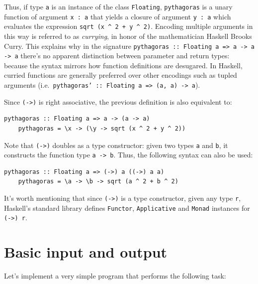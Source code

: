 \documentclass[UdineBachThesis,american,11pt]{PhdThesis}
\begin{document}
  Thus, if type \texttt{a} is an instance of the class \mbox{\texttt{Floating}},
  \mbox{\texttt{pythagoras}} is a unary function of argument
  \mbox{\texttt{x : a}} that yields a closure of argument \mbox{\texttt{y : a}}
  which evaluates the expression
  \mbox{\texttt{sqrt (x {\textasciicircum} 2 + y {\textasciicircum} 2)}}.
  Encoding multiple arguments in this way is referred to as \emph{currying}, in
  honor of the mathematician Haskell Brooks Curry. This explains why in the
  signature \mbox{\texttt{pythagoras :: Floating a => a -> a -> a}} there's no
  apparent distinction between parameter and return types: because the syntax
  mirrors how function definitions are desugared. In Haskell, curried functions
  are generally preferred over other encodings such as tupled arguments (i.e.\
  \mbox{\texttt{pythagoras' :: Floating a => (a, a) -> a}}).

  Since \mbox{\texttt{(->)}} is right associative, the previous definition is
  also equivalent to:

  \begin{Verbatim}[gobble=4,fontsize=\small]
    pythagoras :: Floating a => a -> (a -> a)
    pythagoras = \x -> (\y -> sqrt (x ^ 2 + y ^ 2))
  \end{Verbatim}

  Note that \mbox{\texttt{(->)}} doubles as a type constructor: given two types
  \texttt{a} and \texttt{b}, it constructs the function type
  \mbox{\texttt{a -> b}}. Thus, the following syntax can also be used:

  \begin{Verbatim}[gobble=4,fontsize=\small]
    pythagoras :: Floating a => (->) a ((->) a a)
    pythagoras = \a -> \b -> sqrt (a ^ 2 + b ^ 2)
  \end{Verbatim}

  It's worth mentioning that since \mbox{\texttt{(->)}} is a type constructor,
  given any type \texttt{r}, Haskell's standard library defines
  \mbox{\texttt{Functor}}, \mbox{\texttt{Applicative}} and \mbox{\texttt{Monad}}
  instances for \mbox{\texttt{(->) r}}.

  \section{Basic input and output}

  Let's implement a very simple program that performs the following task:
\end{document}
